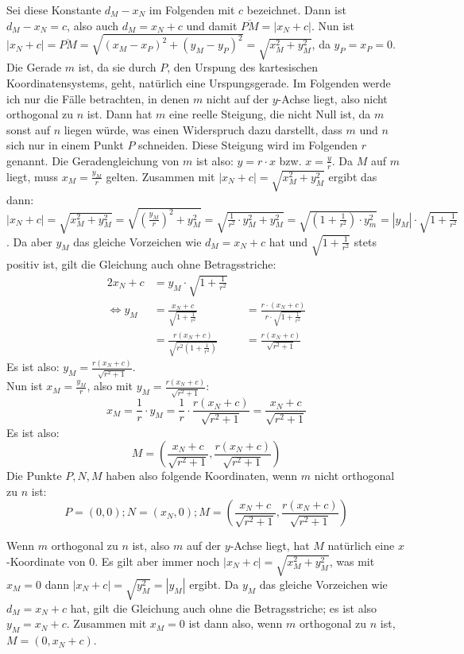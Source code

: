 Sei diese Konstante $d_M-x_N$ im Folgenden mit $c$ bezeichnet. Dann ist $d_M-x_N=c$, also auch $d_M=x_N+c$ und damit 
$\overline{PM}=|x_N+c|$. Nun ist $|x_N+c|=\overline{PM}=\sqrt{(x_M-x_P)^2+(y_M-y_P)^2}=\sqrt{x_M^2+y_M^2}$, da 
$y_P=x_P=0$. Die Gerade $m$ ist, da sie durch $P$, den Urspung des kartesischen Koordinatensystems, geht, natürlich 
eine Urspungsgerade. Im Folgenden werde ich nur die Fälle betrachten, in denen $m$ nicht auf der $y$-Achse liegt, 
also nicht orthogonal zu $n$ ist. Dann hat $m$ eine reelle Steigung, die nicht Null ist, da $m$ sonst auf $n$ liegen 
würde, was einen Widerspruch dazu darstellt, dass $m$ und $n$ sich nur in einem Punkt $P$ schneiden. Diese Steigung 
wird im Folgenden $r$ genannt. Die Geradengleichung von $m$ ist also: $y=r\cdot x$ bzw. $x=\frac{y}{r}$. Da $M$ auf 
$m$ liegt, muss $x_M=\frac{y_M}{r}$ gelten. Zusammen mit $|x_N+c|=\sqrt{x_M^2+y_M^2}$ ergibt das dann: $|x_N+c|
=\sqrt{x_M^2+y_M^2}=\sqrt{(\frac{y_M}{r})^2+y_M^2}=\sqrt{\frac{1}{r^2}\cdot y_M^2+y_M^2}=\sqrt{(1+\frac{1}{r^2})
\cdot y_m^2}=|y_M|\cdot\sqrt{1+\frac{1}{r^2}}$. Da aber $y_M$ das gleiche Vorzeichen wie $d_M=x_N+c$ hat und 
$\sqrt{1+\frac{1}{r^2}}$ stets positiv ist, gilt die Gleichung auch ohne Betragsstriche:
\begin{alignat*}{2}
    x_N+c&=y_M\cdot\sqrt{1+\frac{1}{r^2}}&&\\
    \Leftrightarrow y_M&=\frac{x_N+c}{\sqrt{1+\frac{1}{r^2}}}&&=\frac{r\cdot (x_N+c)}{r\cdot\sqrt{1+\frac{1}{r^2}}}\\
    &=\frac{r(x_N+c)}{\sqrt{r^2\left(1+\frac{1}{r^2}\right)}}&&=\frac{r(x_N+c)}{\sqrt{r^2+1}}
\end{alignat*}
Es ist also: $y_M=\frac{r(x_N+c)}{\sqrt{r^2+1}}$.\\
Nun ist $x_M=\frac{y_M}{r}$, also mit $y_M=\frac{r(x_N+c)}{\sqrt{r^2+1}}$:
\[
    x_M=\frac{1}{r}\cdot y_M=\frac{1}{r}\cdot \frac{r(x_N+c)}{\sqrt{r^2+1}}=\frac{x_N+c}{\sqrt{r^2+1}}
\]
Es ist also:
\[
    M=\left( \frac{x_N+c}{\sqrt{r^2+1}} , \frac{r(x_N+c)}{\sqrt{r^2+1}} \right)
\]
Die Punkte $P, N, M$ haben also folgende Koordinaten, wenn $m$ nicht orthogonal zu $n$ ist:
\[
    P=(0, 0); N=(x_N, 0); M=\left( \frac{x_N+c}{\sqrt{r^2+1}} , \frac{r(x_N+c)}{\sqrt{r^2+1}} \right)
\]

Wenn $m$ orthogonal zu $n$ ist, also $m$ auf der $y$-Achse liegt, hat $M$ natürlich eine $x$-Koordinate von 0. 
Es gilt aber immer noch $|x_N+c|=\sqrt{x_M^2+y_M^2}$, was mit $x_M=0$ dann $|x_N+c|=\sqrt{y_M^2}=|y_M|$ ergibt. Da 
$y_M$ das gleiche Vorzeichen wie $d_M=x_N+c$ hat, gilt die Gleichung auch ohne die Betragsstriche; es ist also $y_M
=x_N+c$. Zusammen mit $x_M=0$ ist dann also, wenn $m$ orthogonal zu $n$ ist, $M=(0, x_N+c)$.

